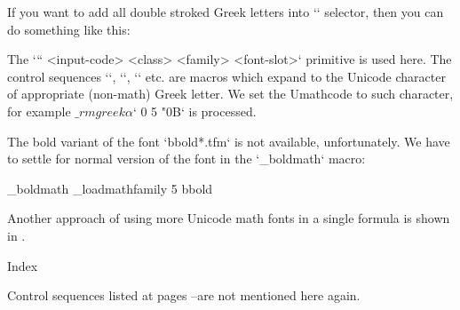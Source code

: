 \begtt \typosize[10/12]
\endtt

If you want to add all double stroked Greek letters into `\bball`
selector, then you can do something like this:

\begtt \typosize[10/12]
\def\setbbgreekA #1{\Umathcode \_ea`#1 0 5 \tmpnum \advance\tmpnum by1 }

\addto{}
\endtt
%
The \x`\Umathcode`` <input-code> <class> <family> <font-slot>` primitive is used
here. The control sequences `\alpha`, `\beta`, `\gamma` etc. are macros which expand
to the Unicode character of appropriate (non-math) Greek letter. We set the
Umathcode to such character, for example
$\_rmgreek\alpha$` 0 5 "0B` is processed.

The bold variant of the font `bbold*.tfm` is not available, unfortunately.
We have to settle for normal version of the font in the `\_boldmath` macro:

\begtt \typosize[10/12]
   \addto \_boldmath {\_loadmathfamily 5 bbold }
\endtt

Another approach of using more Unicode math fonts in a single formula is
shown in
.

\sec Index

Control sequences listed at pages \pgref[listA]--\pgref[listB] are not
mentioned here again.

\makeindex
\endmulti

\bye

